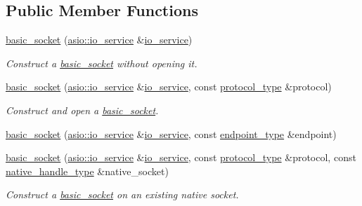 \subsection*{Public Member Functions}
\begin{DoxyCompactItemize}
\item 
\hyperlink{classasio_1_1basic__socket_abd4fd7dc373e6060a4f99b152a6d3651}{basic\+\_\+socket} (\hyperlink{classasio_1_1io__service}{asio\+::io\+\_\+service} \&\hyperlink{classasio_1_1io__service}{io\+\_\+service})
\begin{DoxyCompactList}\small\item\em Construct a \hyperlink{classasio_1_1basic__socket}{basic\+\_\+socket} without opening it. \end{DoxyCompactList}\item 
\hyperlink{classasio_1_1basic__socket_aec1d4e8a101b13361d04b6ce5d5dcf8f}{basic\+\_\+socket} (\hyperlink{classasio_1_1io__service}{asio\+::io\+\_\+service} \&\hyperlink{classasio_1_1io__service}{io\+\_\+service}, const \hyperlink{classasio_1_1basic__socket_a5890addc84762c67f2b3f1723428721d}{protocol\+\_\+type} \&protocol)
\begin{DoxyCompactList}\small\item\em Construct and open a \hyperlink{classasio_1_1basic__socket}{basic\+\_\+socket}. \end{DoxyCompactList}\item 
\hyperlink{classasio_1_1basic__socket_a0f827d53f34fded44d824f195b5ee1d1}{basic\+\_\+socket} (\hyperlink{classasio_1_1io__service}{asio\+::io\+\_\+service} \&\hyperlink{classasio_1_1io__service}{io\+\_\+service}, const \hyperlink{classasio_1_1basic__socket_a6b2ba27d020bb24356c691f19f8d2829}{endpoint\+\_\+type} \&endpoint)
\item 
\hyperlink{classasio_1_1basic__socket_a9865f1b65e42a95ba8deeea733422103}{basic\+\_\+socket} (\hyperlink{classasio_1_1io__service}{asio\+::io\+\_\+service} \&\hyperlink{classasio_1_1io__service}{io\+\_\+service}, const \hyperlink{classasio_1_1basic__socket_a5890addc84762c67f2b3f1723428721d}{protocol\+\_\+type} \&protocol, const \hyperlink{classasio_1_1basic__socket_a3481ac06d51afa0cb23f09cd39ac64eb}{native\+\_\+handle\+\_\+type} \&native\+\_\+socket)
\begin{DoxyCompactList}\small\item\em Construct a \hyperlink{classasio_1_1basic__socket}{basic\+\_\+socket} on an existing native socket. \end{DoxyCompactList}\item 

\end{DoxyCompactItemize}
